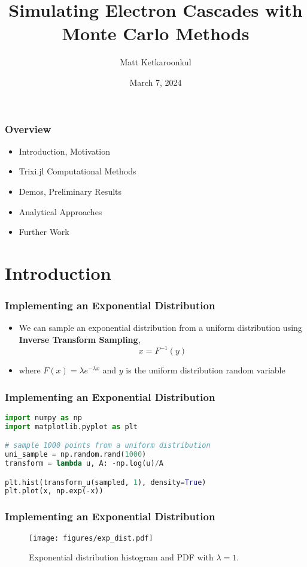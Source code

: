 \documentclass{beamer}
\title{Simulating Electron Cascades with Monte Carlo Methods}
\author{Matt Ketkaroonkul}
\date{March 7, 2024}
\begin{document}
\maketitle
\begin{frame}
\frametitle{Overview}
\begin{itemize}
    \item Introduction, Motivation
    \item Trixi.jl Computational Methods
    \item Demos, Preliminary Results
    \item Analytical Approaches
    \item Further Work
\end{itemize} 
\end{frame}

\section{Introduction}
\begin{frame}
\frametitle{Implementing an Exponential Distribution}
\begin{itemize}
    \item We can sample an exponential distribution from a uniform distribution using {\bf Inverse Transform Sampling},
        \begin{equation}
            x = F^{-1} (y) 
        \end{equation}
    \item where \( F(x)=\lambda e^{-\lambda x} \) and \( y \) is the uniform distribution random variable
\end{itemize}
\end{frame}

\begin{frame}[fragile]
\frametitle{Implementing an Exponential Distribution}
\begin{lstlisting}[language=Python]
import numpy as np
import matplotlib.pyplot as plt

# sample 1000 points from a uniform distribution
uni_sample = np.random.rand(1000)
transform = lambda u, A: -np.log(u)/A

plt.hist(transform_u(sampled, 1), density=True)
plt.plot(x, np.exp(-x))
\end{lstlisting}
\end{frame}

\begin{frame}
    \frametitle{Implementing an Exponential Distribution}
    \begin{figure}
        \begin{center}
            \texttt{[image: figures/exp\_dist.pdf]}
        \end{center}
        \caption{Exponential distribution histogram and PDF with \( \lambda = 1 \).}\label{fig:exp-dist}
    \end{figure}
\end{frame}
\end{document}
